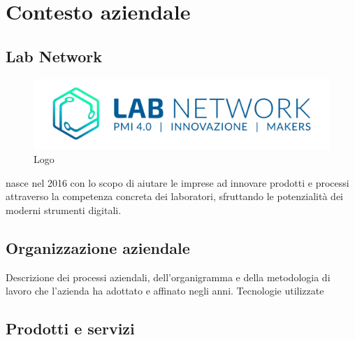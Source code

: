 
\chapter{Contesto aziendale}
\label{cap:introduzione}

\section{Lab Network}

\begin{figure}[h]
	\begin{center}
	\includegraphics[scale=0.4]{immagini/LOGO_LABNETWORK.png}
	\caption{Logo \lab{}}
	\end{center}
\end{figure}

\lab{} nasce nel 2016 con lo scopo di aiutare le imprese ad innovare prodotti e processi attraverso la competenza concreta dei laboratori, sfruttando le potenzialità dei moderni strumenti digitali.

\section{Organizzazione aziendale}
Descrizione dei processi aziendali, dell'organigramma e della metodologia di lavoro che l'azienda ha adottato e affinato negli anni.
Tecnologie utilizzate

\newpage
\section{Prodotti e servizi}
